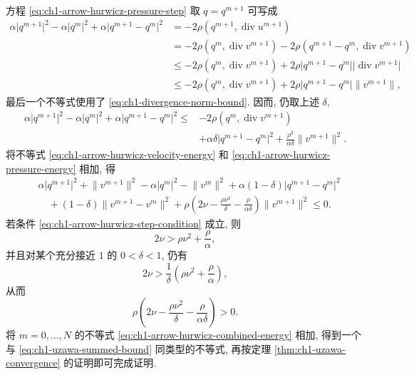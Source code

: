 \begin{Proof}
方程 \eqref{eq:ch1-arrow-hurwicz-pressure-step} 取 $q=q^{m+1}$ 可写成
\[
\begin{aligned}
\alpha\lvert q^{m+1}\rvert^2-\alpha\lvert q^m\rvert^2
+\alpha\lvert q^{m+1}-q^m\rvert^2
&=-2\rho(q^{m+1},\operatorname{div}u^{m+1})\\
&=-2\rho(q^m,\operatorname{div}v^{m+1})
-2\rho(q^{m+1}-q^m,\operatorname{div}v^{m+1})\\
&\leq-2\rho(q^m,\operatorname{div}v^{m+1})
+2\rho\lvert q^{m+1}-q^m\rvert\lvert\operatorname{div}v^{m+1}\rvert\\
&\leq-2\rho(q^m,\operatorname{div}v^{m+1})
+2\rho\lvert q^{m+1}-q^m\rvert\lVert v^{m+1}\rVert,
\end{aligned}
\]
最后一个不等式使用了 \eqref{eq:ch1-divergence-norm-bound}. 因而, 仍取上述 $\delta$,
\begin{equation}
\begin{aligned}
\alpha\lvert q^{m+1}\rvert^2-\alpha\lvert q^m\rvert^2
+\alpha\lvert q^{m+1}-q^m\rvert^2
\leq{}&-2\rho(q^m,\operatorname{div}v^{m+1})\\
&+\alpha\delta\lvert q^{m+1}-q^m\rvert^2
+\frac{\rho^2}{\alpha\delta}\lVert v^{m+1}\rVert^2.
\end{aligned}
\label{eq:ch1-arrow-hurwicz-pressure-energy}
\end{equation}
将不等式 \eqref{eq:ch1-arrow-hurwicz-velocity-energy} 和 \eqref{eq:ch1-arrow-hurwicz-pressure-energy} 相加, 得
\begin{equation}
\begin{aligned}
&\alpha\lvert q^{m+1}\rvert^2+\lVert v^{m+1}\rVert^2
-\alpha\lvert q^m\rvert^2-\lVert v^m\rVert^2
+\alpha(1-\delta)\lvert q^{m+1}-q^m\rvert^2\\
&\quad +(1-\delta)\lVert v^{m+1}-v^m\rVert^2
+\rho\left(2\nu-\frac{\rho\nu^2}{\delta}
-\frac{\rho}{\alpha\delta}\right)\lVert v^{m+1}\rVert^2\leq0.
\end{aligned}
\label{eq:ch1-arrow-hurwicz-combined-energy}
\end{equation}
若条件 \eqref{eq:ch1-arrow-hurwicz-step-condition} 成立, 则
\[
2\nu>\rho\nu^2+\frac{\rho}{\alpha},
\]
并且对某个充分接近 $1$ 的 $0<\delta<1$, 仍有
\[
2\nu>\frac{1}{\delta}\left(\rho\nu^2+\frac{\rho}{\alpha}\right),
\]
从而
\begin{equation}
\rho\left(2\nu-\frac{\rho\nu^2}{\delta}
-\frac{\rho}{\alpha\delta}\right)>0.
\label{eq:ch1-arrow-hurwicz-positive-coefficient}
\end{equation}
将 $m=0,\ldots,N$ 的不等式 \eqref{eq:ch1-arrow-hurwicz-combined-energy} 相加, 得到一个与 \eqref{eq:ch1-uzawa-summed-bound} 同类型的不等式, 再按定理 \ref{thm:ch1-uzawa-convergence} 的证明即可完成证明.
\end{Proof}


